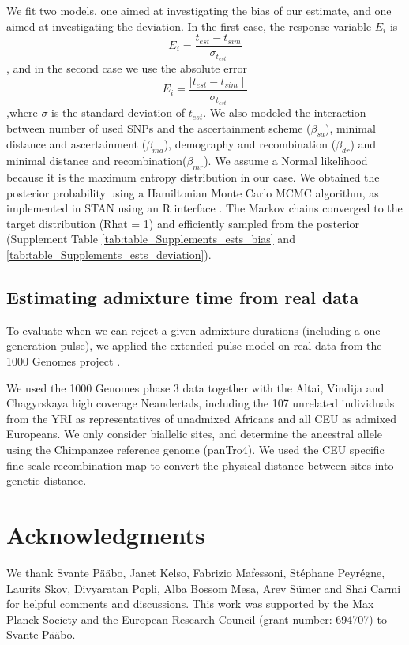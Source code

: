\documentclass[11pt]{article}
\begin{document}
We fit two models, one aimed at investigating the bias of our estimate, and one aimed at investigating the deviation. In the first case, the response variable $E_i$ is
$$E_i = \frac{t_{est} - t_{sim}}{\sigma_{t_{est}}}$$, and in the second case we use the absolute error $$E_i = \frac{\mid t_{est} - t_{sim} \mid}{\sigma_{t_{est}}}$$,where $\sigma$ is the standard deviation of $t_{est}$. We also modeled the interaction between number of used SNPs and the ascertainment scheme ($\beta_{sa}$), minimal distance and ascertainment ($\beta_{ma}$), demography and recombination ($\beta_{dr}$) and minimal distance and recombination($\beta_{mr}$).
We assume a Normal likelihood because it is the maximum entropy distribution in our case. We obtained the posterior probability using a Hamiltonian Monte Carlo MCMC algorithm, as implemented in STAN \citep{carpenter_stan_2017} using an R interface \citep{stan_development_team_rstan_2018,mcelreath_statistical_2020}. The Markov chains converged to the target distribution (Rhat = 1) and efficiently sampled from the posterior (Supplement Table \ref{tab:table_Supplements_ests_bias} and \ref{tab:table_Supplements_ests_deviation}).  


\subsection{Estimating admixture time from real data}\label{Estimating admixture time from real data}
To evaluate when we can reject a given admixture durations (including a one generation pulse), we applied the extended pulse model on real data from the 1000 Genomes project \citep{the_1000_genomes_project_consortium_global_2015}.

We used the 1000 Genomes phase 3 data together with the Altai, Vindija and Chagyrskaya high coverage Neandertals, including the 107 unrelated individuals from the YRI as representatives of unadmixed Africans and all CEU as admixed Europeans. We only consider biallelic sites, and determine the ancestral allele using  the Chimpanzee reference genome (panTro4). We used the CEU specific fine-scale recombination map \citep{spence_inference_2019} to convert the physical distance between sites into genetic distance. 


\section{Acknowledgments}

We thank Svante P\"a\"abo, Janet Kelso, Fabrizio Mafessoni, St\'{e}phane Peyr\'{e}gne, Laurits Skov, Divyaratan Popli, Alba Bossom Mesa, Arev S\"umer and Shai Carmi for helpful comments and discussions.
This work was supported by the Max Planck Society and the European Research Council (grant number: 694707) to Svante P\"a\"abo.
\end{document}
